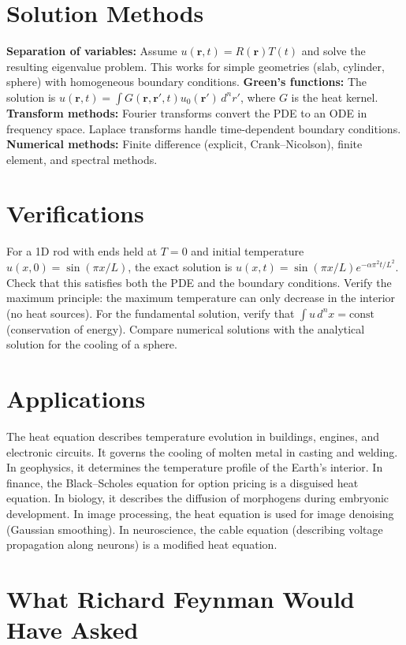 \documentclass[11pt,openright]{book}
\begin{document}
\section*{Solution Methods}

\textbf{Separation of variables:} Assume $u(\mathbf{r}, t) = R(\mathbf{r})T(t)$ and solve the resulting eigenvalue problem. This works for simple geometries (slab, cylinder, sphere) with homogeneous boundary conditions. \textbf{Green's functions:} The solution is $u(\mathbf{r}, t) = \int G(\mathbf{r}, \mathbf{r}', t) u_0(\mathbf{r}')\,d^n r'$, where $G$ is the heat kernel. \textbf{Transform methods:} Fourier transforms convert the PDE to an ODE in frequency space. Laplace transforms handle time-dependent boundary conditions. \textbf{Numerical methods:} Finite difference (explicit, Crank--Nicolson), finite element, and spectral methods.
\section*{Verifications}

For a 1D rod with ends held at $T = 0$ and initial temperature $u(x, 0) = \sin(\pi x/L)$, the exact solution is $u(x, t) = \sin(\pi x/L)e^{-\alpha\pi^2 t/L^2}$. Check that this satisfies both the PDE and the boundary conditions. Verify the maximum principle: the maximum temperature can only decrease in the interior (no heat sources). For the fundamental solution, verify that $\int u\,d^nx = \text{const}$ (conservation of energy). Compare numerical solutions with the analytical solution for the cooling of a sphere.
\section*{Applications}

The heat equation describes temperature evolution in buildings, engines, and electronic circuits. It governs the cooling of molten metal in casting and welding. In geophysics, it determines the temperature profile of the Earth's interior. In finance, the Black--Scholes equation for option pricing is a disguised heat equation. In biology, it describes the diffusion of morphogens during embryonic development. In image processing, the heat equation is used for image denoising (Gaussian smoothing). In neuroscience, the cable equation (describing voltage propagation along neurons) is a modified heat equation.
\section*{What Richard Feynman Would Have Asked}
\end{document}
